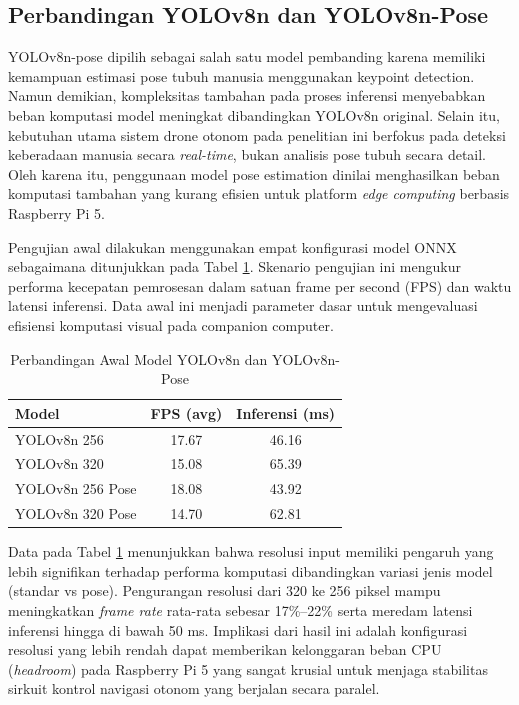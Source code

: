 \subsection{Perbandingan YOLOv8n dan YOLOv8n-Pose}

YOLOv8n-pose dipilih sebagai salah satu model pembanding karena memiliki kemampuan estimasi pose tubuh manusia menggunakan keypoint detection.
Namun demikian, kompleksitas tambahan pada proses inferensi menyebabkan beban komputasi model meningkat dibandingkan YOLOv8n original.
Selain itu, kebutuhan utama sistem drone otonom pada penelitian ini berfokus pada deteksi keberadaan manusia secara \textit{real-time}, bukan analisis pose tubuh secara detail.
Oleh karena itu, penggunaan model pose estimation dinilai menghasilkan beban komputasi tambahan yang kurang efisien untuk platform \textit{edge computing} berbasis Raspberry Pi 5.

Pengujian awal dilakukan menggunakan empat konfigurasi model ONNX sebagaimana ditunjukkan pada Tabel \ref{tab:model_compare_awal}. Skenario pengujian ini mengukur performa kecepatan pemrosesan dalam satuan frame per second (FPS) dan waktu latensi inferensi. Data awal ini menjadi parameter dasar untuk mengevaluasi efisiensi komputasi visual pada companion computer.

\begin{table}[H]
	\centering
	\caption{Perbandingan Awal Model YOLOv8n dan YOLOv8n-Pose}
	\label{tab:model_compare_awal}
	\renewcommand{\arraystretch}{1.2}
	\begin{tabular}{|p{5cm}|c|c|}
		\hline
		Model & FPS (avg) & Inferensi (ms) \\ \hline
		
		YOLOv8n 256 &
		17.67 &
		46.16 \\ \hline
		
		YOLOv8n 320 &
		15.08 &
		65.39 \\ \hline
		
		YOLOv8n 256 Pose &
		18.08 &
		43.92 \\ \hline
		
		YOLOv8n 320 Pose &
		14.70 &
		62.81 \\ \hline
	\end{tabular}
\end{table}

Data pada Tabel \ref{tab:model_compare_awal} menunjukkan bahwa resolusi input memiliki pengaruh yang lebih signifikan terhadap performa komputasi dibandingkan variasi jenis model (standar vs pose). Pengurangan resolusi dari 320 ke 256 piksel mampu meningkatkan \textit{frame rate} rata-rata sebesar 17\%--22\% serta meredam latensi inferensi hingga di bawah 50 ms. Implikasi dari hasil ini adalah konfigurasi resolusi yang lebih rendah dapat memberikan kelonggaran beban CPU (\textit{headroom}) pada Raspberry Pi 5 yang sangat krusial untuk menjaga stabilitas sirkuit kontrol navigasi otonom yang berjalan secara paralel.

